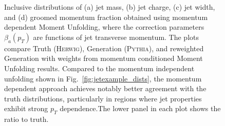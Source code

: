 \begin{figure}
    \caption[Momentum dependent unfolding of inclusive jet substructure distributions]{Inclusive distributions of (a) jet mass, (b) jet charge, (c) jet width, and (d) groomed momentum fraction obtained using momentum dependent Moment Unfolding, where the correction parameters $\beta_a(p_T)$ are functions of jet transverse momentum. The plots compare Truth (\textsc{Herwig}), Generation (\textsc{Pythia}), and reweighted Generation with weights from momentum conditioned Moment Unfolding results. Compared to the momentum independent unfolding shown in Fig.~\ref{fig:jetexample_dists}, the momentum dependent approach achieves notably better agreement with the truth distributions, particularly in regions where jet properties exhibit strong $p_T$ dependence.The lower panel in each plot shows the ratio to truth.}
    \label{fig:pjetexample}
\end{figure}
